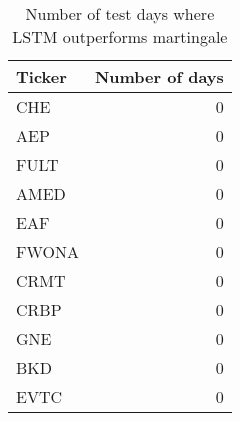 \begin{table}[H]
\centering
\caption{Number of test days where LSTM outperforms martingale}
\label{tab:tickers_never_outperformed}
\begin{tabular}{lr}
\toprule
Ticker & Number of days \\
\midrule
CHE & 0 \\
AEP & 0 \\
FULT & 0 \\
AMED & 0 \\
EAF & 0 \\
FWONA & 0 \\
CRMT & 0 \\
CRBP & 0 \\
GNE & 0 \\
BKD & 0 \\
EVTC & 0 \\
\bottomrule
\end{tabular}
\end{table}
